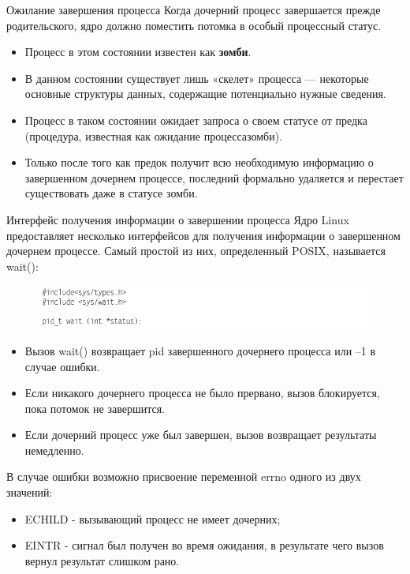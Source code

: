 \documentclass{beamer}
\begin{document}
\begin{frame}{Ожилание завершения процесса}
Когда дочерний процесс завершается прежде родительского, ядро должно поместить потомка в особый процессный статус. 
\begin{itemize}
\item Процесс в этом состоянии известен как \textbf{зомби}. 
\item В данном состоянии существует лишь «скелет» процесса — некоторые основные структуры данных, содержащие потенциально нужные сведения. 
\item Процесс в таком состоянии ожидает запроса о своем статусе от предка (процедура, известная как ожидание процесса­зомби). 
\item Только после того как предок получит всю необходимую информацию о завершенном дочернем процессе, последний формально удаляется и перестает существовать даже в статусе зомби.
\end{itemize}
\end{frame}

\begin{frame}{Интерфейс получения информации о завершении процесса}
Ядро Linux предоставляет несколько интерфейсов для получения информации
о завершенном дочернем процессе. Самый простой из них, определенный POSIX,
называется wait(): 
\begin{figure}[h]
\centering
\includegraphics[scale=0.5]{images/lec07-pic12.png}
\end{figure}
\begin{itemize}
\item Вызов wait() возвращает pid завершенного дочернего процесса или –1 в случае
ошибки. 
\item Если никакого дочернего процесса не было прервано, вызов блокируется,
пока потомок не завершится. 
\item Если дочерний процесс уже был завершен, вызов возвращает результаты немедленно.
\end{itemize}
В случае ошибки возможно присвоение переменной errno одного из двух значений:
\begin{itemize}
\item ECHILD - вызывающий процесс не имеет дочерних;
\item EINTR - сигнал был получен во время ожидания, в результате чего вызов вернул
результат слишком рано.
\end{itemize}
\end{frame}
\end{document}
